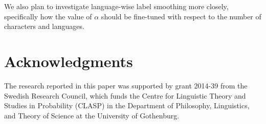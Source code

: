 \documentclass[11pt,a4paper]{article}
\begin{document}
We also plan to investigate language-wise label smoothing more
closely, specifically how the value of $\alpha$ should be fine-tuned
with respect to the number of characters and languages.

\section*{Acknowledgments}

The research reported in this paper was supported by grant 2014-39
from the Swedish Research Council, which funds the Centre for
Linguistic Theory and Studies in Probability (CLASP) in the Department
of Philosophy, Linguistics, and Theory of Science at the University
of Gothenburg.

 



\end{document}
